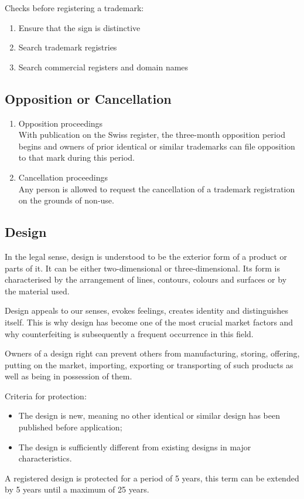\documentclass[11pt]{article}
\theoremstyle{definition}
\begin{document}
Checks before registering a trademark:
\begin{enumerate}
	\item Ensure that the sign is distinctive
	\item Search trademark registries
	\item Search commercial registers and domain names
\end{enumerate}

\subsection{Opposition or Cancellation}
\begin{enumerate}
	\item Opposition proceedings\\
	With publication on the Swiss register, the three-month opposition period begins and owners of prior identical or similar trademarks can file opposition to that mark during this period.
	\item Cancellation proceedings\\
	Any person is allowed to request the cancellation of a trademark registration on the grounds of non-use.
\end{enumerate}

\subsection{Design}
In the legal sense, design is understood to be the exterior form of a product or parts of it. It can be either two-dimensional or three-dimensional. Its form is characterised by the arrangement of lines, contours, colours and surfaces or by the material used.

Design appeals to our senses, evokes feelings, creates identity and distinguishes itself. This is why design has become one of the most crucial market factors and why counterfeiting is subsequently a frequent occurrence in this field.

Owners of a design right can prevent others from manufacturing, storing, offering, putting on the market, importing, exporting or transporting of such products as well as  being in possession of them.

Criteria for protection:
\begin{itemize}[label=-,noitemsep]
	\item The design is new, meaning no other identical or similar design has been published before application;
	\item The design is sufficiently different from existing designs in major characteristics.
\end{itemize}

A registered design is protected for a period of 5 years, this term can be extended by 5 years until a maximum of 25 years.
\end{document}
